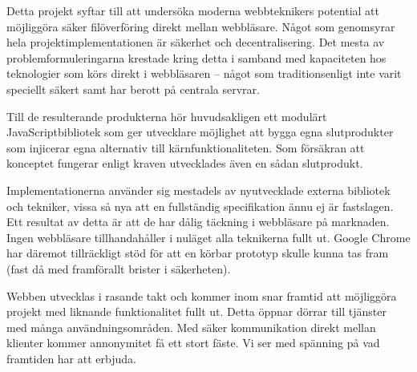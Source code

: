 Detta projekt syftar till att undersöka moderna webbteknikers potential att möjliggöra säker filöverföring direkt mellan webbläsare. Något som genomsyrar hela projektimplementationen är säkerhet och decentralisering. Det mesta av problemformuleringarna krestade kring detta i samband med kapaciteten hos teknologier som körs direkt i webbläsaren – något som traditionsenligt inte varit speciellt säkert samt har berott på centrala servrar.

Till de resulterande produkterna hör huvudsakligen ett modulärt JavaScriptbibliotek som ger utvecklare möjlighet att bygga egna slutprodukter som injicerar egna alternativ till kärnfunktionaliteten. Som försäkran att konceptet fungerar enligt kraven utvecklades även en sådan slutprodukt.

Implementationerna använder sig mestadels av nyutvecklade externa bibliotek och tekniker, vissa så nya att en fullständig specifikation ännu ej är fastslagen. Ett resultat av detta är att de har dålig täckning i webbläsare på marknaden. Ingen webbläsare tillhandahåller i nuläget alla teknikerna fullt ut. Google Chrome har däremot tillräckligt stöd för att en körbar prototyp skulle kunna tas fram (fast då med framförallt brister i säkerheten).

Webben utvecklas i rasande takt och kommer inom snar framtid att möjliggöra projekt med liknande funktionalitet fullt ut. Detta öppnar dörrar till tjänster med många användningsområden. Med säker kommunikation direkt mellan klienter kommer annonymitet få ett stort fäste. Vi ser med spänning på vad framtiden har att erbjuda.


